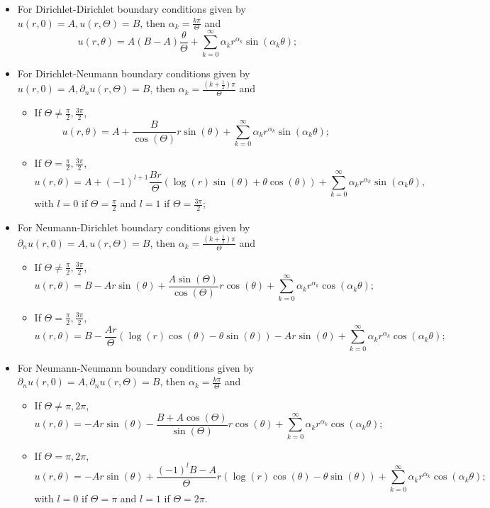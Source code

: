 \begin{itemize}
    \item For Dirichlet-Dirichlet boundary conditions given by \(u(r, 0) = A, u(r, \Theta) = B\), then \(\alpha_k = \frac{k \pi}{\Theta}\) and
    \[
        u(r, \theta) = A (B-A)\frac{\theta}{\Theta} + \sum_{k=0}^{\infty}\alpha_k r^{\alpha_k}\sin(\alpha_k \theta);
    \]
    \item For Dirichlet-Neumann boundary conditions given by \(u(r, 0) = A, \partial_n u(r, \Theta) = B\), then \(\alpha_k = \frac{\left(k+\frac{1}{2}\right) \pi}{\Theta}\) and
    \begin{itemize}
        \item If \(\Theta \neq \frac{\pi}{2}, \frac{3 \pi}{2}\),
        \[
            u(r, \theta) = A + \frac{B}{\cos(\Theta)} r \sin (\theta) + \sum_{k=0}^{\infty}\alpha_k r^{\alpha_k}\sin(\alpha_k \theta);
        \]
        \item If \(\Theta = \frac{\pi}{2}, \frac{3 \pi}{2}\),
        \[
            u(r, \theta) = A + (-1)^{l+1}\frac{B r}{\Theta}\left(\log(r) \sin(\theta) + \theta \cos(\theta) \right) + \sum_{k=0}^{\infty}\alpha_k r^{\alpha_k}\sin(\alpha_k \theta),
        \]
        with \(l = 0\) if \(\Theta = \frac{\pi}{2}\) and \(l = 1\) if \(\Theta = \frac{3\pi}{2}\);
    \end{itemize}
    \item For Neumann-Dirichlet boundary conditions given by \(\partial_n u(r, 0) = A, u(r, \Theta) = B\), then \(\alpha_k = \frac{\left(k+\frac{1}{2}\right) \pi}{\Theta}\) and
    \begin{itemize}
        \item If \(\Theta \neq \frac{\pi}{2}, \frac{3 \pi}{2}\),
        \[
            u(r, \theta) = B - A r \sin(\theta) + \frac{A \sin (\Theta)}{\cos(\Theta)}r \cos(\theta) + \sum_{k=0}^{\infty}\alpha_k r^{\alpha_k}\cos(\alpha_k \theta);
        \]
        \item If \(\Theta = \frac{\pi}{2}, \frac{3 \pi}{2}\),
        \[
            u(r, \theta) = B - \frac{A r}{\Theta}\left(\log(r) \cos(\theta) - \theta \sin(\theta) \right) - A r \sin(\theta) + \sum_{k=0}^{\infty}\alpha_k r^{\alpha_k}\cos(\alpha_k \theta);
        \]
    \end{itemize}
    \item For Neumann-Neumann boundary conditions given by \(\partial_n u(r, 0) = A, \partial_n u(r, \Theta) = B\), then \(\alpha_k = \frac{k \pi}{\Theta}\) and
    \begin{itemize}
        \item If \(\Theta \neq \pi, 2\pi\),
        \[
            u(r, \theta) = -A r \sin(\theta) - \frac{B + A \cos (\Theta)}{\sin(\Theta)}r \cos(\theta) + \sum_{k=0}^{\infty}\alpha_k r^{\alpha_k}\cos(\alpha_k \theta);
        \]
        \item If \(\Theta = \pi, 2\pi\),
        \[
            u(r, \theta) = -A r \sin(\theta) + \frac{(-1)^l B - A}{\Theta} r \left(\log(r) \cos(\theta) - \theta \sin(\theta) \right) + \sum_{k=0}^{\infty}\alpha_k r^{\alpha_k}\cos(\alpha_k \theta);
        \]
        with \(l = 0\) if \(\Theta = \pi\) and \(l = 1\) if \(\Theta = 2\pi\).
    \end{itemize}
\end{itemize}

